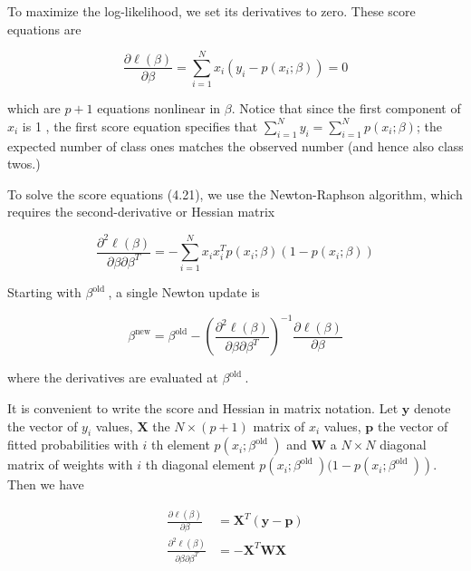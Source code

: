 \documentclass[10pt]{article}
\begin{document}
To maximize the log-likelihood, we set its derivatives to zero. These score equations are


\begin{equation*}
\frac{\partial \ell(\beta)}{\partial \beta}=\sum_{i=1}^{N} x_{i}\left(y_{i}-p\left(x_{i} ; \beta\right)\right)=0 \tag{4.21}
\end{equation*}


which are $p+1$ equations nonlinear in $\beta$. Notice that since the first component of $x_{i}$ is 1 , the first score equation specifies that $\sum_{i=1}^{N} y_{i}=\sum_{i=1}^{N} p\left(x_{i} ; \beta\right)$; the expected number of class ones matches the observed number (and hence also class twos.)

To solve the score equations (4.21), we use the Newton-Raphson algorithm, which requires the second-derivative or Hessian matrix


\begin{equation*}
\frac{\partial^{2} \ell(\beta)}{\partial \beta \partial \beta^{T}}=-\sum_{i=1}^{N} x_{i} x_{i}^{T} p\left(x_{i} ; \beta\right)\left(1-p\left(x_{i} ; \beta\right)\right) \tag{4.22}
\end{equation*}


Starting with $\beta^{\text {old }}$, a single Newton update is


\begin{equation*}
\beta^{\mathrm{new}}=\beta^{\mathrm{old}}-\left(\frac{\partial^{2} \ell(\beta)}{\partial \beta \partial \beta^{T}}\right)^{-1} \frac{\partial \ell(\beta)}{\partial \beta} \tag{4.23}
\end{equation*}


where the derivatives are evaluated at $\beta^{\text {old }}$.

It is convenient to write the score and Hessian in matrix notation. Let $\mathbf{y}$ denote the vector of $y_{i}$ values, $\mathbf{X}$ the $N \times(p+1)$ matrix of $x_{i}$ values, $\mathbf{p}$ the vector of fitted probabilities with $i$ th element $p\left(x_{i} ; \beta^{\text {old }}\right)$ and $\mathbf{W}$ a $N \times N$ diagonal matrix of weights with $i$ th diagonal element $p\left(x_{i} ; \beta^{\text {old }}\right)(1- \left.p\left(x_{i} ; \beta^{\text {old }}\right)\right)$. Then we have


\begin{align*}
\frac{\partial \ell(\beta)}{\partial \beta} & =\mathbf{X}^{T}(\mathbf{y}-\mathbf{p})  \tag{4.24}\\
\frac{\partial^{2} \ell(\beta)}{\partial \beta \partial \beta^{T}} & =-\mathbf{X}^{T} \mathbf{W} \mathbf{X} \tag{4.25}
\end{align*}
\end{document}
